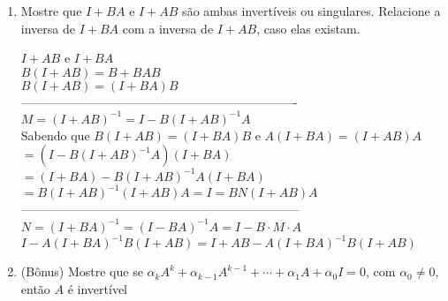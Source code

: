 \documentclass[leqno]{article}
\begin{document}
\begin{enumerate}
\begin{sol}
		
		\end{sol} 
		
		\item Mostre que $I + BA$ e $I + AB$ são ambas invertíveis ou singulares. Relacione a inversa de $I + BA$ com a inversa de $I + AB$, caso elas existam.
		
		\begin{sol} 
			$I + AB$ e $I + BA$\\
			\newline
			$B(I + AB) = B + BAB$\\
			\newline
			$B(I + AB) = (I + BA)B$\\
			-------------------------------------------------------------------
			\newline
			$M = (I + AB)^{-1} = I - B(I + AB)^{-1}A$\\
			\newline
			Sabendo que $B(I + AB) = (I + BA)B$ e $A(I + BA) = (I + AB)A$\\
			\newline
			$= (I - B(I + AB)^{-1}A)(I + BA)$\\
			\newline
			$= (I + BA) - B(I + AB)^{-1}A(I + BA)$\\
			\newline
			$= B(I + AB)^{-1} (I + AB)A = I = BN(I + AB)A$\\
			--------------------------------------------------------------------
			\newline
			$N = (I + BA)^{-1} = (I - BA)^{-1}A =  I - B \cdot M \cdot A$\\
			\newline
			$I - A(I + BA)^{-1}B(I + AB) = I + AB - A(I + BA)^{-1}B(I + AB)$
		\end{sol}
		\newpage
		\item (Bônus) Mostre que se $\alpha_kA^k + \alpha_{k-1}A^{k-1} + \cdots + \alpha_1 A + \alpha_0 I = 0$, com $\alpha_0 \neq 0$, então $A$ é invertível
		
		\begin{sol} 
		\end{sol} 
	\end{enumerate}
	
	
	
	
	
	
	
	
	
	
	
	
	
\end{document}
